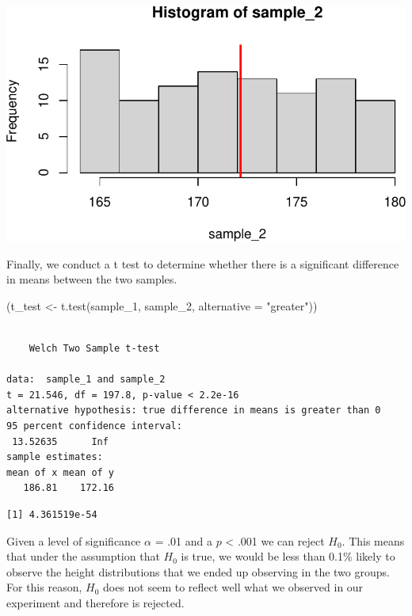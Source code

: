 \documentclass[
  letterpaper,
  DIV=11,
  numbers=noendperiod]{scrartcl}
\newenvironment{Shaded}{\begin{snugshade}}{\end{snugshade}}
\newcommand{\AttributeTok}[1]{\textcolor[rgb]{0.40,0.45,0.13}{#1}}
\newcommand{\FunctionTok}[1]{\textcolor[rgb]{0.28,0.35,0.67}{#1}}
\newcommand{\NormalTok}[1]{\textcolor[rgb]{0.00,0.23,0.31}{#1}}
\newcommand{\OtherTok}[1]{\textcolor[rgb]{0.00,0.23,0.31}{#1}}
\newcommand{\SpecialCharTok}[1]{\textcolor[rgb]{0.37,0.37,0.37}{#1}}
\newcommand{\StringTok}[1]{\textcolor[rgb]{0.13,0.47,0.30}{#1}}
\begin{document}
\includegraphics{stats_review_files/figure-pdf/unnamed-chunk-21-1.pdf}

Finally, we conduct a t test to determine whether there is a significant
difference in means between the two samples.

\begin{Shaded}
\begin{Highlighting}[]
\NormalTok{(t\_test }\OtherTok{\textless{}{-}} \FunctionTok{t.test}\NormalTok{(sample\_1, sample\_2, }\AttributeTok{alternative =} \StringTok{"greater"}\NormalTok{))}
\end{Highlighting}
\end{Shaded}

\begin{verbatim}

    Welch Two Sample t-test

data:  sample_1 and sample_2
t = 21.546, df = 197.8, p-value < 2.2e-16
alternative hypothesis: true difference in means is greater than 0
95 percent confidence interval:
 13.52635      Inf
sample estimates:
mean of x mean of y 
   186.81    172.16 
\end{verbatim}

\begin{Shaded}
\end{Shaded}

\begin{verbatim}
[1] 4.361519e-54
\end{verbatim}

Given a level of significance \(\alpha\) = .01 and a \(p\) \textless{}
.001 we can reject \(H_0\). This means that under the assumption that
\(H_0\) is true, we would be less than 0.1\% likely to observe the
height distributions that we ended up observing in the two groups. For
this reason, \(H_0\) does not seem to reflect well what we observed in
our experiment and therefore is rejected.
\end{document}
